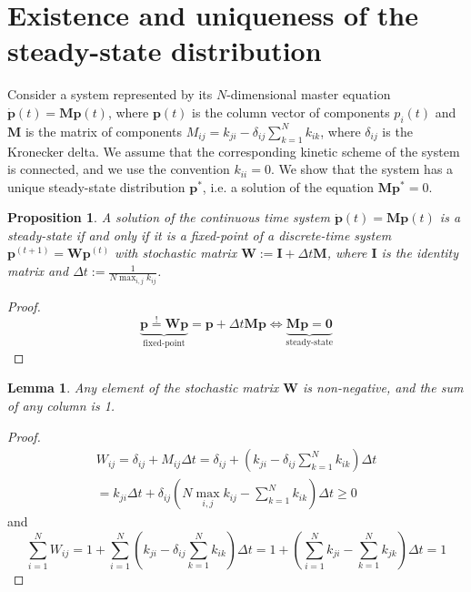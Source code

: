 \documentclass{article}
\newtheorem{proposition}{Proposition}
\newtheorem{lemma}{Lemma}
\theoremstyle{remark}
\begin{document}
\section{Existence and uniqueness of the steady-state distribution}
\label{app:steady-state-dist}
    Consider a system represented by its $N$-dimensional master equation $\dot{\mathbf{p}}(t) = \mathbf{M}\mathbf{p}(t)$, where $\mathbf{p}(t)$ is the column vector of components $p_i(t)$ and $\mathbf{M}$ is the matrix of components $M_{ij}=k_{ji} - \delta_{ij}\sum_{k=1}^N k_{ik}$, where $\delta_{ij}$ is the Kronecker delta. We assume that the corresponding kinetic scheme of the system is connected, and we use the convention $k_{ii}=0$.
    We show that the system has a unique steady-state distribution $\mathbf{p}^*$, i.e. a solution of the equation $\mathbf{M}\mathbf{p}^* = 0$.

    \begin{proposition}
        A solution of the continuous time system $\dot{\mathbf{p}}(t) = \mathbf{M}\mathbf{p}(t)$ is a steady-state if and only if it is a fixed-point of a discrete-time system $\mathbf{p}^{(t+1)} = \mathbf{W}\mathbf{p}^{(t)}$ with stochastic matrix $\mathbf{W} := \mathbf{I} + \Delta t \mathbf{M}$, where $\mathbf{I}$ is the identity matrix and $\Delta t := \frac{1}{N\max_{i,j}k_{ij}}$.
    \end{proposition}

    \begin{proof}
        \begin{equation}
            \underbrace{\mathbf{p} \overset{!}{=} \mathbf{W}\mathbf{p}}_\text{fixed-point} 
            = \mathbf{p} + \Delta t \mathbf{M}\mathbf{p}
            \iff \underbrace{\mathbf{M}\mathbf{p} = \mathbf{0}}_\text{steady-state}
        \end{equation}
    \end{proof}

    \begin{lemma}
        Any element of the stochastic matrix $\mathbf{W}$ is non-negative, and the sum of any column is 1.
    \end{lemma}
    
    \begin{proof} 
        \begin{multline}
            W_{ij} 
            = \delta_{ij} + M_{ij}\Delta t 
            = \delta_{ij} + (k_{ji} - \delta_{ij}\sum_{k=1}^N k_{ik})\Delta t \\
            = k_{ji}\Delta t + \delta_{ij} \left(N\max_{i,j}k_{ij} - \sum_{k=1}^N k_{ik}\right)\Delta t
            \geq 0
        \end{multline}
        and
        \begin{equation}
            \sum_{i=1}^N W_{ij}
            = 1 + \sum_{i=1}^N \left(k_{ji} - \delta_{ij}\sum_{k=1}^N k_{ik}\right) \Delta t
            = 1 + \left(\sum_{i=1}^N k_{ji} - \sum_{k=1}^N k_{jk}\right) \Delta t
            = 1
        \end{equation}
    \end{proof}
\end{document}
